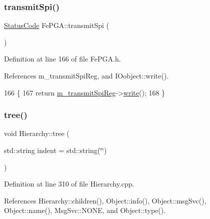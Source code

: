 \subsubsection{\texorpdfstring{transmit\+Spi()}{transmitSpi()}}
{\footnotesize\ttfamily \hyperlink{classStatusCode}{Status\+Code} Fe\+P\+G\+A\+::transmit\+Spi (\begin{DoxyParamCaption}{ }\end{DoxyParamCaption})\hspace{0.3cm}{\ttfamily [inline]}}



Definition at line 166 of file Fe\+P\+G\+A.\+h.



References m\+\_\+transmit\+Spi\+Reg, and I\+Oobject\+::write().


\begin{DoxyCode}
166                            \{
167     \textcolor{keywordflow}{return} \hyperlink{classFePGA_a003ee241fb5f32fb3442174db3fe6f49}{m\_transmitSpiReg}->\hyperlink{classIOobject_a9f6984bc9f0fadcf800f1be2523ac744}{write}();
168   \}
\end{DoxyCode}
\mbox{\label{classHierarchy_a76e914b9a677a22a82deb74d892bf261}} 
\subsubsection{\texorpdfstring{tree()}{tree()}\hspace{0.1cm}{\footnotesize\ttfamily [1/2]}}
{\footnotesize\ttfamily void Hierarchy\+::tree (\begin{DoxyParamCaption}\item[{std\+::string}]{indent = {\ttfamily std\+:\+:string(\char`\"{}\char`\"{})} }\end{DoxyParamCaption})\hspace{0.3cm}{\ttfamily [inherited]}}



Definition at line 310 of file Hierarchy.\+cpp.



References Hierarchy\+::children(), Object\+::info(), Object\+::msg\+Svc(), Object\+::name(), Msg\+Svc\+::\+N\+O\+NE, and Object\+::type().


